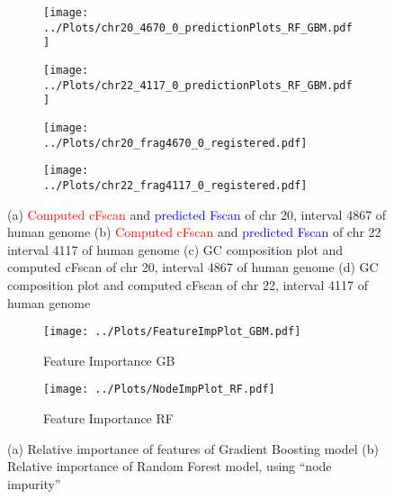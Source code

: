 \begin{figure}[H]
\centering
\begin{subfigure}{0.45\linewidth}
\texttt{[image: ../Plots/chr20\_4670\_0\_predictionPlots\_RF\_GBM.pdf]}
\caption{}
\label{fig:PredictionExamples_a}
\end{subfigure}
\begin{subfigure}{0.45\linewidth}
\texttt{[image: ../Plots/chr22\_4117\_0\_predictionPlots\_RF\_GBM.pdf]} \\
\caption{}
\label{fig:PredictionExamples_c}
\end{subfigure}

\begin{subfigure}{0.45\linewidth}
\vspace{0.25cm}
\texttt{[image: ../Plots/chr20\_frag4670\_0\_registered.pdf]}
\caption{}
\label{fig:PredictionExamples_b}
\end{subfigure}
\begin{subfigure}{0.45\linewidth}
\texttt{[image: ../Plots/chr22\_frag4117\_0\_registered.pdf]}
\caption{}
\label{fig:PredictionExamples_d}
\end{subfigure}
\caption{(a) \textcolor{red}{Computed cFscan} and \textcolor{blue}{predicted Fscan} of chr 20, interval 4867 of human genome (b) \textcolor{red}{Computed cFscan} and \textcolor{blue}{predicted Fscan} of chr 22 interval 4117 of human genome (c) GC composition plot and computed cFscan of chr 20, interval 4867 of human genome (d) GC composition plot and computed cFscan of chr 22, interval 4117 of human genome} 
\label{fig:PredictionExamples}
\end{figure}

\begin{figure}[H]
\centering
\begin{subfigure}{0.45\linewidth}
\caption{Feature Importance GB}
\texttt{[image: ../Plots/FeatureImpPlot\_GBM.pdf]}
\label{fig:FeatureImp_a}
\end{subfigure}
\begin{subfigure}{0.45\linewidth}
\caption{Feature Importance RF}
\texttt{[image: ../Plots/NodeImpPlot\_RF.pdf]}
\label{fig:FeatureImp_b}
\end{subfigure}
\label{fig:FeatureImp}
\caption{(a) Relative importance \cite{Friedman_2001_AnnStat} of features of Gradient Boosting model (b) Relative importance of Random Forest model, using ``node impurity'' \cite{Hastie_etal_2009_Elements} }
\end{figure}




